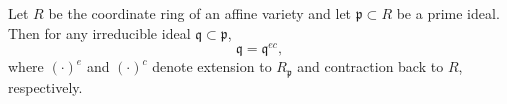 Let $R$ be the coordinate ring of an affine variety and let $\mathfrak{p} \subset R$ be a prime ideal. Then for any irreducible ideal $\mathfrak{q} \subset \mathfrak{p}$,
$$\mathfrak{q} = \mathfrak{q}^{ec},$$
where $(\cdot)^e$ and $(\cdot)^c$ denote extension to $R_{\mathfrak{p}}$ and contraction back to $R$, respectively.
